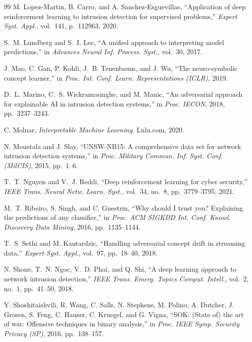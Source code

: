 \documentclass[12pt, letterpaper, oneside]{report}
\begin{document}
\begin{thebibliography}{99}
M. Lopez-Martin, B. Carro, and A. Sanchez-Esguevillas, ``Application of deep reinforcement learning to intrusion detection for supervised problems,'' \textit{Expert Syst. Appl.}, vol.~141, p.~112963, 2020.

S.~M. Lundberg and S.~I. Lee, ``A unified approach to interpreting model predictions,'' in \textit{Advances Neural Inf. Process. Syst.}, vol.~30, 2017.

J. Mao, C. Gan, P. Kohli, J.~B. Tenenbaum, and J. Wu, ``The neuro-symbolic concept learner,'' in \textit{Proc. Int. Conf. Learn. Representations (ICLR)}, 2019.

D.~L. Marino, C.~S. Wickramasinghe, and M. Manic, ``An adversarial approach for explainable AI in intrusion detection systems,'' in \textit{Proc. IECON}, 2018, pp.~3237--3243.

C. Molnar, \textit{Interpretable Machine Learning}. Lulu.com, 2020.

N. Moustafa and J. Slay, ``UNSW-NB15: A comprehensive data set for network intrusion detection systems,'' in \textit{Proc. Military Commun. Inf. Syst. Conf. (MilCIS)}, 2015, pp.~1--6.

T.~T. Nguyen and V.~J. Reddi, ``Deep reinforcement learning for cyber security,'' \textit{IEEE Trans. Neural Netw. Learn. Syst.}, vol.~34, no.~8, pp.~3779--3795, 2021.

M.~T. Ribeiro, S. Singh, and C. Guestrin, ``Why should I trust you? Explaining the predictions of any classifier,'' in \textit{Proc. ACM SIGKDD Int. Conf. Knowl. Discovery Data Mining}, 2016, pp.~1135--1144.

T.~S. Sethi and M. Kantardzic, ``Handling adversarial concept drift in streaming data,'' \textit{Expert Syst. Appl.}, vol.~97, pp.~18--40, 2018.

N. Shone, T.~N. Ngoc, V.~D. Phai, and Q. Shi, ``A deep learning approach to network intrusion detection,'' \textit{IEEE Trans. Emerg. Topics Comput. Intell.}, vol.~2, no.~1, pp.~41--50, 2018.

Y. Shoshitaishvili, R. Wang, C. Salls, N. Stephens, M. Polino, A. Dutcher, J. Grosen, S. Feng, C. Hauser, C. Kruegel, and G. Vigna, ``SOK: (State of) the art of war: Offensive techniques in binary analysis,'' in \textit{Proc. IEEE Symp. Security Privacy (SP)}, 2016, pp.~138--157.


\end{thebibliography}
\end{document}
